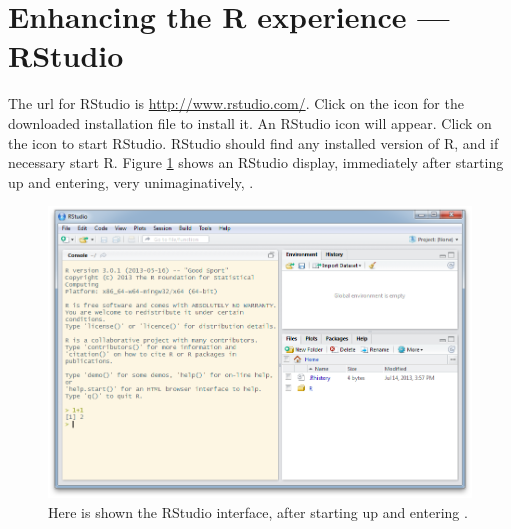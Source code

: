 \section{Enhancing the R experience --- RStudio}\label{sec:RStudio}

The url for RStudio is \url{http://www.rstudio.com/}.  Click on the
icon for the downloaded installation file to install it. An RStudio
icon will appear.  Click on the icon to start RStudio.  RStudio should
find any installed version of R, and if necessary start R.  Figure
\ref{fig:rstudio} shows an RStudio display, immediately after starting
up and entering, very unimaginatively, .

\begin{figure}
\includegraphics{figs-inc/03i-all4.png}
\caption{Here is shown the RStudio interface, after starting up and
  entering .}\label{fig:rstudio}
\end{figure}
\pagebreak

